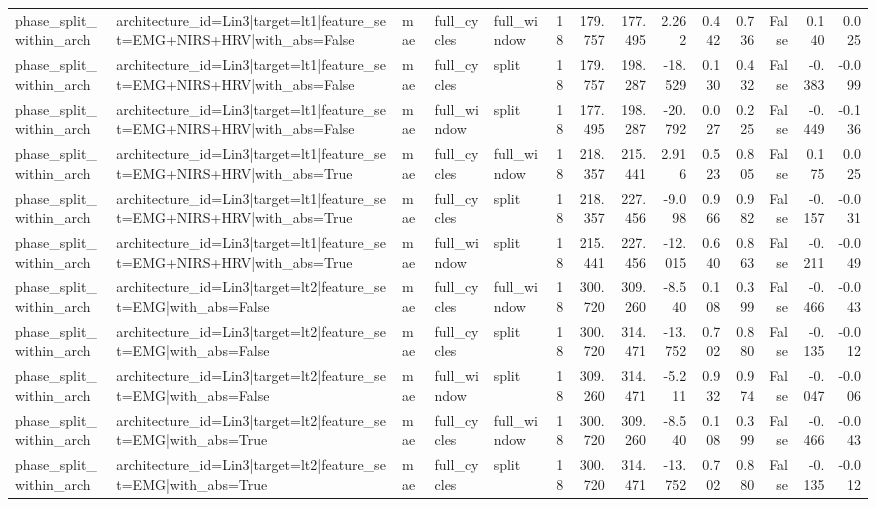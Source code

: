 \begin{table}
\begin{tabular}{lllllrrrrrrrrr}
phase_split_within_arch & architecture_id=Lin3|target=lt1|feature_set=EMG+NIRS+HRV|with_abs=False & mae & full_cycles & full_window & 18 & 179.757 & 177.495 & 2.262 & 0.442 & 0.736 & False & 0.140 & 0.025 \\
phase_split_within_arch & architecture_id=Lin3|target=lt1|feature_set=EMG+NIRS+HRV|with_abs=False & mae & full_cycles & split & 18 & 179.757 & 198.287 & -18.529 & 0.130 & 0.432 & False & -0.383 & -0.099 \\
phase_split_within_arch & architecture_id=Lin3|target=lt1|feature_set=EMG+NIRS+HRV|with_abs=False & mae & full_window & split & 18 & 177.495 & 198.287 & -20.792 & 0.027 & 0.225 & False & -0.449 & -0.136 \\
phase_split_within_arch & architecture_id=Lin3|target=lt1|feature_set=EMG+NIRS+HRV|with_abs=True & mae & full_cycles & full_window & 18 & 218.357 & 215.441 & 2.916 & 0.523 & 0.805 & False & 0.175 & 0.025 \\
phase_split_within_arch & architecture_id=Lin3|target=lt1|feature_set=EMG+NIRS+HRV|with_abs=True & mae & full_cycles & split & 18 & 218.357 & 227.456 & -9.098 & 0.966 & 0.982 & False & -0.157 & -0.031 \\
phase_split_within_arch & architecture_id=Lin3|target=lt1|feature_set=EMG+NIRS+HRV|with_abs=True & mae & full_window & split & 18 & 215.441 & 227.456 & -12.015 & 0.640 & 0.863 & False & -0.211 & -0.049 \\
phase_split_within_arch & architecture_id=Lin3|target=lt2|feature_set=EMG|with_abs=False & mae & full_cycles & full_window & 18 & 300.720 & 309.260 & -8.540 & 0.108 & 0.399 & False & -0.466 & -0.043 \\
phase_split_within_arch & architecture_id=Lin3|target=lt2|feature_set=EMG|with_abs=False & mae & full_cycles & split & 18 & 300.720 & 314.471 & -13.752 & 0.702 & 0.880 & False & -0.135 & -0.012 \\
phase_split_within_arch & architecture_id=Lin3|target=lt2|feature_set=EMG|with_abs=False & mae & full_window & split & 18 & 309.260 & 314.471 & -5.211 & 0.932 & 0.974 & False & -0.047 & -0.006 \\
phase_split_within_arch & architecture_id=Lin3|target=lt2|feature_set=EMG|with_abs=True & mae & full_cycles & full_window & 18 & 300.720 & 309.260 & -8.540 & 0.108 & 0.399 & False & -0.466 & -0.043 \\
phase_split_within_arch & architecture_id=Lin3|target=lt2|feature_set=EMG|with_abs=True & mae & full_cycles & split & 18 & 300.720 & 314.471 & -13.752 & 0.702 & 0.880 & False & -0.135 & -0.012 \\

\end{tabular}
\end{table}
